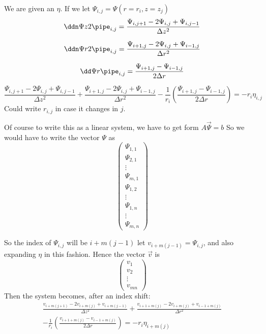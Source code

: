 \documentclass{X:/Documents/Coding/Latex/myreport}
\begin{document}
We are given an $\eta$. 
If we let $\Psi_{i,j} = \Psi(r = r_i, z = z_j)$
\[\ddn \Psi z2\pipe_{i,j} = \frac{\Psi_{i,j+1} - 2 \Psi_{i,j} + \Psi_{i,j-1}}{\Delta z^2}\]

\[\ddn \Psi r2\pipe_{i,j} = \frac{\Psi_{i+1,j} - 2 \Psi_{i,j} + \Psi_{i-1,j}}{\Delta r^2}\]

\[\dd \Psi r \pipe_{i,j} = \frac{\Psi_{i+1,j} - \Psi_{i-1,j}}{2 \Delta r}\]

\[\frac{\Psi_{i,j+1} - 2 \Psi_{i,j} + \Psi_{i,j-1}}{\Delta z^2} + \frac{\Psi_{i+1,j} - 2 \Psi_{i,j} + \Psi_{i-1,j}}{\Delta r^2} - \frac1{r_i} \left( \frac{\Psi_{i+1,j} - \Psi_{i-1,j}}{2 \Delta r}\right) = - r_i \eta_{i,j}\]
Could write $r_{i,j}$ in case it changes in $j$.

Of course to write this as a linear system, we have to get form $A\vec \Psi = b $
So we would have to write the vector $\Psi$ as 
\[\begin{pmatrix}
    \Psi_{1,1}\\
    \Psi_{2,1}\\
    \vdots\\
    \Psi_{m,1}\\
    \Psi_{1,2}\\
    \vdots\\
    \Psi_{1,n}\\
    \vdots\\
    \Psi_{m,n}
\end{pmatrix}\]

So the index of $\Psi_{i,j}$ will be $i + m(j-1)$ let $v_{i+m(j-1)} = \Psi_{i,j}$, and also expanding $\eta$ in this fashion.
Hence the vector $\vec v$ is
\[\begin{pmatrix}
    v_1\\
    v_2\\
    \vdots\\
    v_{mn}
\end{pmatrix}\]
Then the system becomes, after an index shift:
\begin{align*}
    \frac{v_{i+m(j+1)} - 2 v_{i+m(j)} + v_{i+m(j-1)}}{\Delta z^2} + \frac{v_{i+1+m(j)} - 2 v_{i+m(j)} + v_{i-1+m(j)}}{\Delta r^2}\\
     - \frac1{r_i} \left( \frac{v_{i+1+m(j)} - v_{i-1+m(j)}}{2 \Delta r}\right) = - r_i \eta_{i+m(j)}\\
\end{align*}
\end{document}
